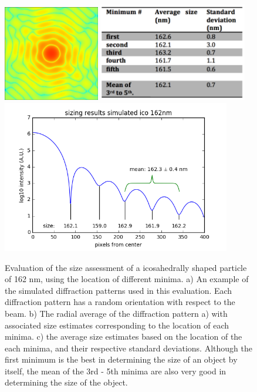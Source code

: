 \begin{figure}[!h]
\centering
\includegraphics[width=42mm]{Chapter_08_ImageClassification_Simulated_Icosahedron.png}
\includegraphics[width=65mm]{Chapter_08_ImageClassification_Stats.png}
\includegraphics[width=100mm]{Chapter_08_ImageClassification_Sizing_Results.png}

\caption{Evaluation of the size assessment of a icosahedrally shaped particle of 162 nm, using the location of different minima. a) An example of the simulated diffraction patterns used in this evaluation. Each diffraction pattern has a random orientation with respect to the beam. b) The radial average of the diffraction pattern a) with associated size estimates corresponding to the location of each minima. c) the average size estimates based on the location of the each minima, and their respective standard deviations. Although the first minimum is the best in determining the size of an object by itself, the mean of the 3rd - 5th minima are also very good in determining the size of the object.}\label{fig:sizing}
\end{figure}



